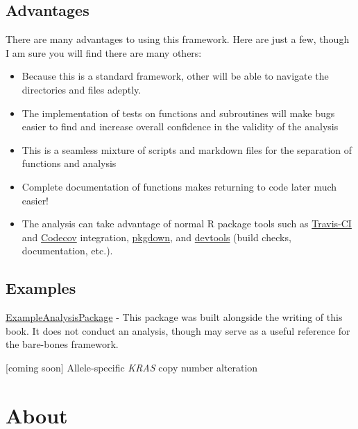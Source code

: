 \documentclass[]{book}
\providecommand{\tightlist}{%
  \setlength{\itemsep}{0pt}\setlength{\parskip}{0pt}}
\begin{document}
\hypertarget{advantages}{%
\subsection*{Advantages}\label{advantages}}

There are many advantages to using this framework. Here are just a few, though I am sure you will find there are many others:

\begin{itemize}
\tightlist
\item
  Because this is a standard framework, other will be able to navigate the directories and files adeptly.
\item
  The implementation of tests on functions and subroutines will make bugs easier to find and increase overall confidence in the validity of the analysis
\item
  This is a seamless mixture of scripts and markdown files for the separation of functions and analysis
\item
  Complete documentation of functions makes returning to code later much easier!
\item
  The analysis can take advantage of normal R package tools such as \href{https://travis-ci.org}{Travis-CI} and \href{https://codecov.io}{Codecov} integration, \href{https://pkgdown.r-lib.org}{pkgdown}, and \href{https://devtools.r-lib.org}{devtools} (build checks, documentation, etc.).
\end{itemize}

\hypertarget{examples}{%
\subsection*{Examples}\label{examples}}

\href{https://github.com/jhrcook/ExampleAnalysisPackage}{ExampleAnalysisPackage} - This package was built alongside the writing of this book. It does not conduct an analysis, though may serve as a useful reference for the bare-bones framework.

{[}coming soon{]} Allele-specific \emph{KRAS} copy number alteration

\hypertarget{about}{%
\section*{About}\label{about}}
\end{document}
